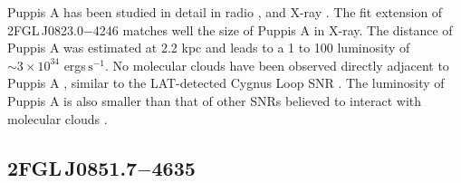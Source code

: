 \documentclass[12pt,preprint]{aastex}
\newcommand{\gev}{\text{GeV}\xspace}
\newcommand{\s}{\text{s}\xspace}
\begin{document}
Puppis A has been studied in detail in radio \citep{puppis_a_vla}, 
and  X-ray \citep{rosat_puppis_a,suzaku_puppis_a}.
The fit extension of 2FGL\,J0823.0$-$4246
matches well the size of Puppis A in X-ray.  The distance of Puppis A was
estimated at 2.2 kpc \citep{reynoso_1995,reynoso_2003} and leads to a 1
\gev to 100 \gev luminosity of $\sim 3\times 10^{34}$ ergs$\,\s^{-1}$.
No molecular clouds have been observed directly adjacent to Puppis A
\citep{co_eastern_puppis_a}, similar to the LAT-detected Cygnus Loop SNR
\citep{cygnus_loop_lat}.  The luminosity of Puppis A is also smaller
than that of other SNRs believed to interact with molecular clouds
\citep{w51c,ic443,w44,w28,w49b_lat}.


%

\subsection{2FGL\,J0851.7$-$4635}
\label{section_2FGL_J0851.7-4635}
\end{document}
